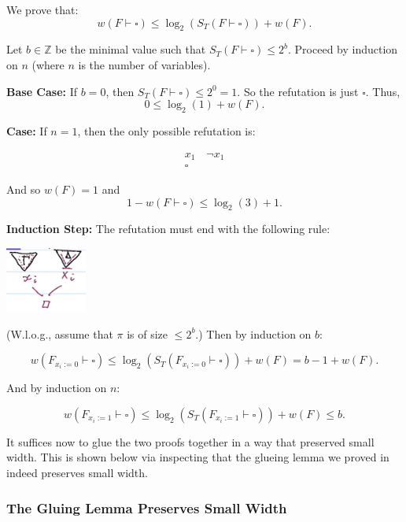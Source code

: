 We prove that:
\[
w(F \vdash \square) \leq \log_2(S_T(F \vdash \square)) + w(F).
\]

Let $b \in \mathbb{Z}$ be the minimal value such that $S_T(F \vdash \square) \leq 2^b$.  
Proceed by induction on $n$ (where $n$ is the number of variables).

\textbf{Base Case:}  
If $b = 0$, then $S_T(F \vdash \square) \leq 2^0 = 1$. So the refutation is just $\square$.  
Thus,  
\[
0 \leq \log_2(1) + w(F).
\]

\textbf{Case:} If $n = 1$, then the only possible refutation is:

\[
\begin{array}{c}
    x_1 \quad \neg x_1 \\
    \hline
    \square
\end{array}
\]

And so $w(F) = 1$ and  
\[
1 - w(F \vdash \square) \leq \log_2(3) + 1.
\]

\textbf{Induction Step:}  
The refutation must end with the following rule:

\includegraphics[width=0.2\textwidth]{images/image016.png}


(W.l.o.g., assume that $\pi$ is of size $\leq 2^b$.) Then by induction on $b$:

\[
w(F_{x_i := 0} \vdash \square) \leq \log_2(S_T(F_{x_i := 0} \vdash \square)) + w(F) = b - 1 + w(F).
\]

And by induction on $n$:

\[
w(F_{x_i := 1} \vdash \square) \leq \log_2(S_T(F_{x_i := 1} \vdash \square)) + w(F) \leq b.
\]

It suffices now to glue the two proofs together in a way that preserved small width.
This is shown below via inspecting that the glueing lemma we proved in  indeed preserves small width. 
\subsubsection{The Gluing Lemma Preserves Small Width }

